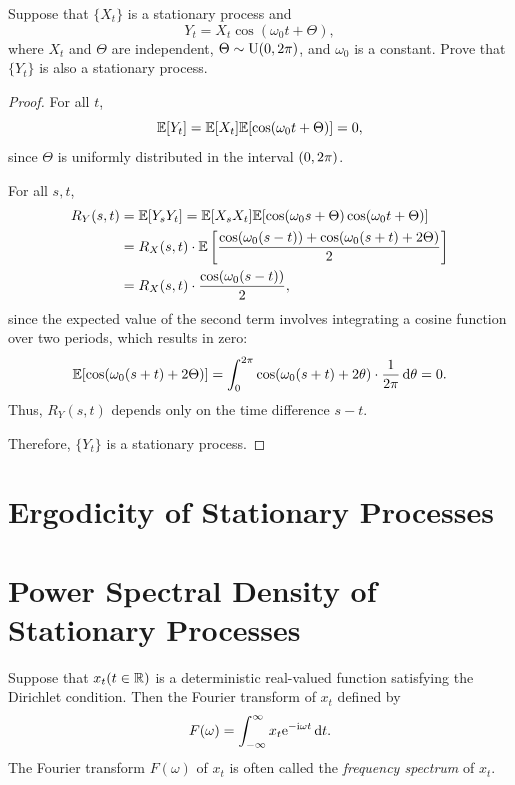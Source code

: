 \begin{example}\label{ex:cosine_wave_random_phase}
  Suppose that \(\{X_t\}\) is a stationary process and
  \[
    Y_t = X_t \cos(\omega_0 t + \Theta),
  \]
  where \(X_t\) and \(\Theta\) are independent, \(\Theta \sim \mathrm{U}(0, 2\mathrm{\pi})\), and \(\omega_0\) is a constant. Prove that \(\{Y_t\}\) is also a stationary process.
\end{example}
\begin{proof}
  For all \(t\),
  \[
    \mathbb{E}[Y_t] = \mathbb{E}[X_t] \mathbb{E}[\cos(\omega_0 t + \Theta)] = 0,
  \]
  since \(\Theta\) is uniformly distributed in the interval \((0, 2\mathrm{\pi})\).

  For all \(s, t\),
  \begin{align*}
    R_Y(s, t) &= \mathbb{E}[Y_s Y_t] = \mathbb{E}[X_s X_t] \mathbb{E}[\cos(\omega_0 s + \Theta) \cos(\omega_0 t + \Theta)] \\
    &= R_X(s, t) \cdot \mathbb{E}\left[\frac{\cos(\omega_0 (s - t)) + \cos(\omega_0 (s + t) + 2\Theta)}{2}\right] \\
    &= R_X(s, t) \cdot \frac{\cos(\omega_0 (s - t))}{2},
  \end{align*}
  since the expected value of the second term involves integrating a cosine function over two periods, which results in zero:
  \[
    \mathbb{E}[\cos(\omega_0 (s + t) + 2\Theta)] = \int_0^{2\mathrm{\pi}} \cos(\omega_0 (s + t) + 2\theta) \cdot \frac{1}{2\mathrm{\pi}} \, \mathrm{d}\theta = 0.
  \]
  Thus, \(R_Y(s, t)\) depends only on the time difference \(s - t\).

  Therefore, \(\{Y_t\}\) is a stationary process.
\end{proof}

\section{Ergodicity of Stationary Processes}

\section{Power Spectral Density of Stationary Processes}

\begin{definition}
  Suppose that \(x_t (t \in \mathbb{R})\) is a deterministic real-valued function satisfying the Dirichlet condition. Then the Fourier transform of \(x_t\) defined by
  \[
    F(\omega) = \int_{-\infty}^\infty x_t \mathrm{e}^{-\mathrm{i} \omega t} \, \mathrm{d} t.
  \]
  The Fourier transform \(F(\omega)\) of \(x_t\) is often called the \emph{frequency spectrum} of \(x_t\).
\end{definition}

